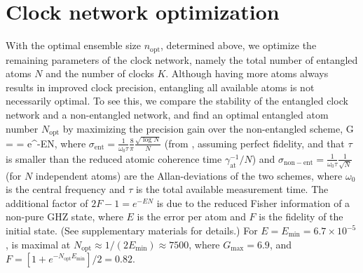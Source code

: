 \section{Clock network optimization}
With the optimal ensemble size $n_\mathrm{opt}$, determined above, we optimize the
remaining parameters of the clock network, namely the total number of entangled
atoms $N$ and the number of clocks $K$. Although having more atoms always
results in improved clock precision, entangling all available atoms is not
necessarily optimal. To see this, we compare the stability of the entangled
clock network and a non-entangled network, and find an optimal entangled atom
number $N_\mathrm{opt}$ by maximizing the precision gain over the non-entangled
scheme,
\bel
\label{eq:gainKomar2015}
	G =  =
	e^{-EN},
\eel 
where $\sigma_\mathrm{ent} = \frac{1}{\omega_0 \tau}\frac{8}{\pi}\frac{\sqrt{\log
N}}{N}$ (from \cite{Komar2014}, assuming perfect fidelity, and that $\tau$ is
smaller than the reduced atomic coherence time $\gamma_\mathrm{at}^{-1}/N$) and
$\sigma_\mathrm{non-ent} = \frac{1}{\omega_0\tau}\frac{1}{\sqrt{N}}$ (for $N$
independent atoms) are the Allan-deviations of the two schemes, where $\omega_0$
is the central frequency and $\tau$ is the total available measurement time.
The additional factor of $2F-1 = e^{-EN}$ is due to the reduced Fisher
information of a non-pure GHZ state, where $E$ is the error per atom and $F$
is the fidelity of the initial state.
(See supplementary materials for details.) For $E = E_\mathrm{min} = 6.7\times
10^{-5}$,  is maximal at $N_\mathrm{opt} \approx
1/(2E_\mathrm{min}) \approx 7500$, where $G_\mathrm{max} = 6.9$, and $F =
[1+e^{-N_\mathrm{opt} E_\mathrm{min}}]/2 = 0.82$.


